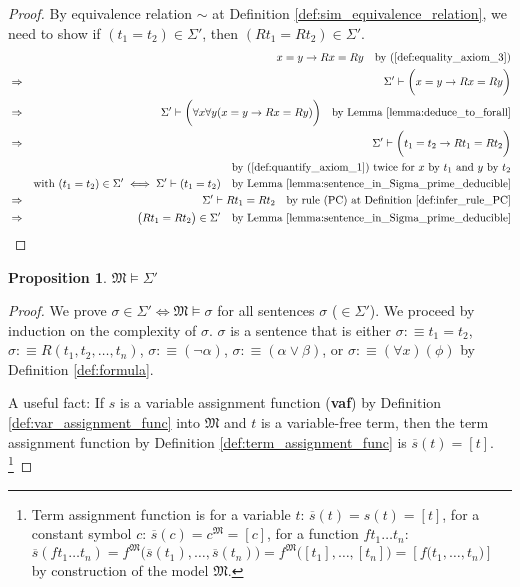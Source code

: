 \documentclass[11pt,letterpaper]{book}
\theoremstyle{definition}
\newtheorem{proposition}{Proposition}[section]
\begin{document}
\begin{enumerate}
\begin{proof}
By equivalence relation $\sim$ at Definition
\ref{def:sim_equivalence_relation}, we need to show if $(t_1 = t_2) \in
\Sigma' $, then $(Rt_1=Rt_2) \in \Sigma' $.
\begin{eqnarray*}
& & x=y \rightarrow R x = R y \quad \text{by
(\ref{def:equality_axiom_3})} \\
& \Rightarrow & \Sigma' \vdash \bigg( x=y \rightarrow R x = R y  \bigg) \\
& \Rightarrow & \Sigma' \vdash \bigg( \forall x \forall y ( x=y
\rightarrow  R x = R y ) \bigg) \quad \text{by Lemma
\ref{lemma:deduce_to_forall}} \\
& \Rightarrow & \Sigma' \vdash \bigg( t_1 = t_2 \rightarrow R t_1 = R
t_2 \bigg) \\
& & \quad \text{by (\ref{def:quantify_axiom_1}) twice for $x$ by
$t_1$ and $y$ by $t_2$} \\
& & \text{with } (t_1 = t_2) \in \Sigma' \iff \Sigma' \vdash (t_1 = t_2)
\quad \text{by Lemma \ref{lemma:sentence_in_Sigma_prime_deducible}} \\
& \Rightarrow & \Sigma' \vdash R t_1 = R t_2 \quad \text{by rule (PC) at
Definition \ref{def:infer_rule_PC}}  \\
& \Rightarrow &  \big( R t_1 = R t_2 \big) \in \Sigma' \quad \text{by
Lemma \ref{lemma:sentence_in_Sigma_prime_deducible}}
\end{eqnarray*}


\end{proof}

\begin{proposition}\label{proposition:model_sigma_prime}
$\mathfrak{M} \models \Sigma'$
\end{proposition}

\begin{proof}
     We prove $\sigma \in \Sigma' \iff \mathfrak{M} \models \sigma  $ for
all sentences $\sigma$ ($ \in \Sigma'$). We proceed by induction on the
complexity of $\sigma$. $\sigma$ is a sentence that is either
$\sigma:\equiv t_1 = t_2$, $ \sigma:\equiv R(t_1 , t_2 , \ldots , t_n
)$, $\sigma:\equiv (\lnot \alpha)$, $\sigma:\equiv (\alpha \lor \beta)$,
or $\sigma:\equiv (\forall x) (\phi) $ by Definition \ref{def:formula}.

     A useful fact: If $s$ is a variable assignment function
(\textbf{vaf}) by Definition \ref{def:var_assignment_func} into
$\mathfrak{M}$ and $t$ is a variable-free term, then the term assignment
function by Definition \ref{def:term_assignment_func} is $\overline{s}
(t)= [t] $. \footnote{Term assignment function is for a variable $t$:
$\overline{s}(t) = s(t) = [t]$, for a constant symbol $c$: $
\overline{s} (c) =  c^{\mathfrak{M}} = [c]$, for a function $f t_1
\ldots t_n $: $\overline{s} ( f t_1 \ldots t_n ) = f^{\mathfrak{M}}
\big( \overline{s} (t_1), \ldots, \overline{s} (t_n) \big) =
f^{\mathfrak{M}} \big( [t_1], \ldots, [t_n] \big) = [f \big( t_1,
\ldots, t_n \big)]$ by construction of the model $\mathfrak{M}$.}


\end{proof}
\end{enumerate}
\end{document}
